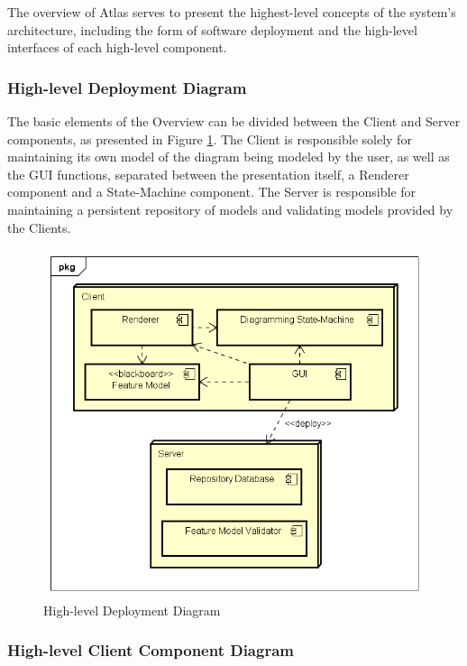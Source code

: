 The overview of Atlas serves to present the highest-level concepts of the system's architecture, including the form of software deployment and the high-level interfaces of each high-level component.

\subsubsection{High-level Deployment Diagram}

The basic elements of the Overview can be divided between the Client and Server components, as presented in Figure \ref{fig_overview}. The Client is responsible solely for maintaining its own model of the diagram being modeled by the user, as well as the GUI functions, separated between the presentation itself, a Renderer component and a State-Machine component. The Server is responsible for maintaining a persistent repository of models and validating models provided by the Clients.

\begin{figure}[ht]
    \centering
        \includegraphics[scale=0.65]{figures/Overview.png}
	\caption{High-level Deployment Diagram}
	\label{fig_overview}
\end{figure}

\subsubsection{High-level Client Component Diagram}

